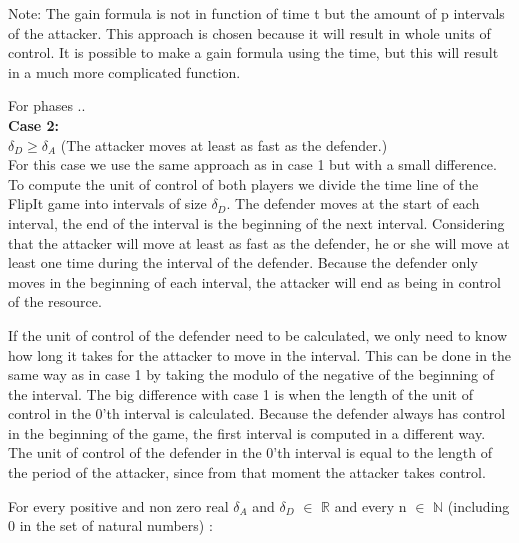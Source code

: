 Note: The gain formula is not in function of time t but the amount of p intervals of the attacker. This approach is chosen because it will result in whole units of control. It is possible to make a gain formula using the time, but this will result in a much more complicated function. 



For phases .. \\

\textbf{Case  2:} \\
$\delta_{D} \geq \delta_{A}$ (The attacker moves at least as fast as the defender.) \\

For this case we use the same approach as in case 1 but with a small difference. To compute the unit of control of both players we divide the time line of the FlipIt game into intervals of size $\delta_{D}$.  The defender moves at the start of each interval, the end of the interval is the beginning of the next interval. Considering that the attacker will move at least as fast as the defender, he or she will move at least one time during the interval of the defender. Because the defender only moves in the beginning of each interval, the attacker will end as being in control of the resource.

If the unit of control of the defender need to be calculated, we only need to know how long it takes for the attacker to move in the interval. This can be done in the same way as in case 1 by taking the modulo of the negative of the beginning of the interval. The big difference with case 1 is when the length of the unit of control in the 0'th interval is calculated. Because the defender always has control in the beginning of the game, the first interval is computed in a different way. The unit of control of the defender in the 0'th interval is equal to the length of the period of the attacker, since from that moment the attacker takes control.

For every positive and non zero real $\delta_{A}$ and $\delta_{D}$ $\in$ \(\mathbb{R}\) and every n $\in$ \(\mathbb{N}\) (including 0 in the set of natural numbers) :\\

